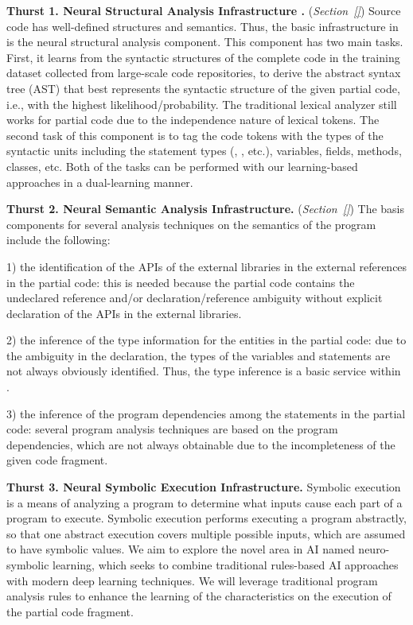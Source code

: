 \vspace{3pt}
\noindent \textbf{Thurst 1. Neural Structural Analysis Infrastructure
  .} ({\em Section~\ref{}}) Source code has
well-defined structures and semantics. Thus, the basic infrastructure
in {\tool} is the neural structural analysis component.  This
component has two main tasks. First, it learns from the syntactic
structures of the complete code in the training dataset collected from
large-scale code repositories, to derive the abstract syntax tree
(AST) that best represents the syntactic structure of the given
partial code, i.e., with the highest likelihood/probability.  The
traditional lexical analyzer still works for partial code due to the
independence nature of lexical tokens. The second task of this
component is to tag the code tokens with the types of the syntactic
units including the statement types (, , etc.),
variables, fields, methods, classes, etc. Both of the tasks can be
performed with our learning-based approaches in a dual-learning
manner.
  
\vspace{3pt}
\noindent \textbf{Thurst 2. Neural Semantic Analysis Infrastructure.}
({\em Section~\ref{}}) The basis components for several analysis
techniques on the semantics of the program include the following:

1) the identification of the APIs of the external libraries in the
external references in the partial code: this is needed because the
partial code contains the undeclared reference and/or
declaration/reference ambiguity without explicit declaration of the
APIs in the external libraries.

2) the inference of the type information for the entities in the
partial code: due to the ambiguity in the declaration, the types of
the variables and statements are not always obviously
identified. Thus, the type inference is a basic service within
{\tool}.

3) the inference of the program dependencies among the statements in
the partial code: several program analysis techniques are based on the
program dependencies, which are not always obtainable due to the
incompleteness of the given code fragment.

\vspace{3pt}
\noindent \textbf{Thurst 3. Neural Symbolic Execution Infrastructure.}
Symbolic execution is a means of analyzing a program to determine what
inputs cause each part of a program to execute. Symbolic execution
performs executing a program abstractly, so that one abstract
execution covers multiple possible inputs, which are assumed to have
symbolic values. We aim to explore the novel area in AI named
neuro-symbolic learning, which seeks to combine traditional
rules-based AI approaches with modern deep learning techniques.  We
will leverage traditional program analysis rules to enhance the
learning of the characteristics on the execution of the partial code
fragment.

